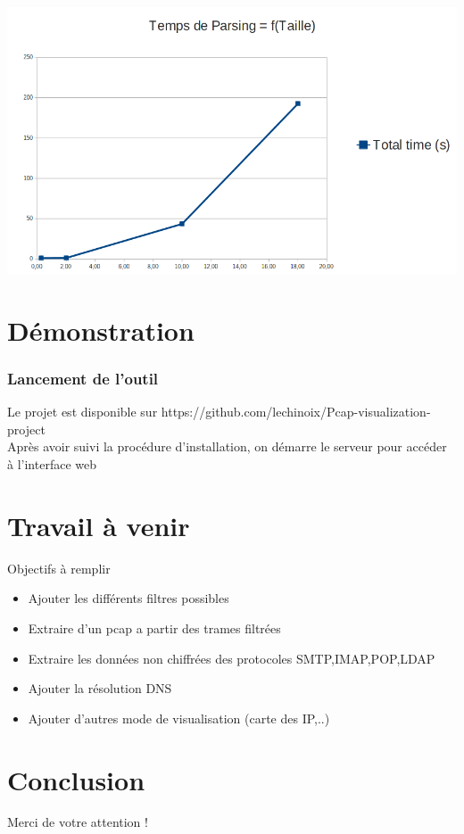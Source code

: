\documentclass{beamer}
\begin{document}
  \begin{frame}
    \begin{center}
       \includegraphics[scale=0.3]{parse-temps.png}
    \end{center} 
  \end{frame}

  
 \section{Démonstration}
  \begin{frame}
    \frametitle{Lancement de l'outil}
    Le projet est disponible sur https://github.com/lechinoix/Pcap-visualization-project \\
    Après avoir suivi la procédure d'installation, on démarre le serveur pour accéder à l'interface web \\
  \end{frame}


  \section{Travail à venir}
  \begin{frame}
    Objectifs à remplir
    \begin{itemize}
     \item Ajouter les différents filtres possibles
     \item Extraire d'un pcap a partir des trames filtrées
     \item Extraire les données non chiffrées des protocoles SMTP,IMAP,POP,LDAP
     \item Ajouter la résolution DNS
     \item Ajouter d'autres mode de visualisation (carte des IP,..)
    \end{itemize}
  \end{frame}


  \section{Conclusion}
  \begin{frame}
    \begin{center}
      Merci de votre attention !
    \end{center}
  \end{frame}
\end{document}
